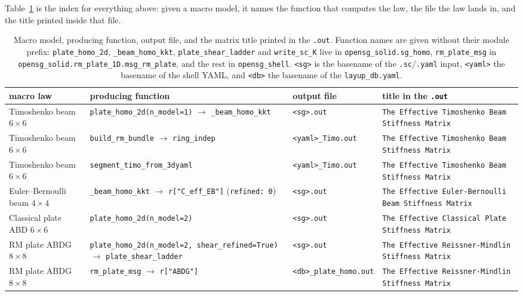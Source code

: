 Table~\ref{tab:lawmap} is the index for everything above: given a macro model,
it names the function that computes the law, the file the law lands in, and the
title printed inside that file.

\begin{table}[htbp]
\centering
\caption{Macro model, producing function, output file, and the matrix title
printed in the \texttt{.out}. Function names are given without their module
prefix: \texttt{plate\_homo\_2d}, \texttt{\_beam\_homo\_kkt},
\texttt{plate\_shear\_ladder} and \texttt{write\_sc\_K} live in
\texttt{opensg\_solid.sg\_homo}, \texttt{rm\_plate\_msg} in
\texttt{opensg\_solid.rm\_plate\_1D.msg\_rm\_plate}, and the rest in
\texttt{opensg\_shell}. \texttt{<sg>} is the basename of the
\texttt{.sc}/\texttt{.yaml} input, \texttt{<yaml>} the basename of the shell
YAML, and \texttt{<db>} the basename of the \texttt{layup\_db.yaml}.}
\label{tab:lawmap}
\scriptsize
\begin{tabular}{p{2.5cm}p{4.6cm}p{3.9cm}p{3.5cm}}
\toprule
macro law & producing function & output file & title in the \texttt{.out} \\
\midrule
Timoshenko beam $6\times6$ & \texttt{plate\_homo\_2d(n\_model=1)} $\rightarrow$ \texttt{\_beam\_homo\_kkt} & \texttt{<sg>.out} & \texttt{The Effective Timoshenko Beam Stiffness Matrix} \\
Timoshenko beam $6\times6$ & \texttt{build\_rm\_bundle} $\rightarrow$ \texttt{ring\_indep} & \texttt{<yaml>\_Timo.out} & \texttt{The Effective Timoshenko Beam Stiffness Matrix} \\
Timoshenko beam $6\times6$ & \texttt{segment\_timo\_from\_3dyaml} & \texttt{<yaml>\_Timo.out} & \texttt{The Effective Timoshenko Beam Stiffness Matrix} \\
Euler--Bernoulli beam $4\times4$ & \texttt{\_beam\_homo\_kkt} $\rightarrow$ \texttt{r["C\_eff\_EB"]} (\texttt{refined: 0}) & \texttt{<sg>.out} & \texttt{The Effective Euler-Bernoulli Beam Stiffness Matrix} \\
Classical plate ABD $6\times6$ & \texttt{plate\_homo\_2d(n\_model=2)} & \texttt{<sg>.out} & \texttt{The Effective Classical Plate Stiffness Matrix} \\
RM plate ABDG $8\times8$ & \texttt{plate\_homo\_2d(n\_model=2, shear\_refined=True)} $\rightarrow$ \texttt{plate\_shear\_ladder} & \texttt{<sg>.out} & \texttt{The Effective Reissner-Mindlin Stiffness Matrix} \\
RM plate ABDG $8\times8$ & \texttt{rm\_plate\_msg} $\rightarrow$ \texttt{r["ABDG"]} & \texttt{<db>\_plate\_homo.out} & \texttt{The Effective Reissner-Mindlin Stiffness Matrix} \\

\end{tabular}
\end{table}

